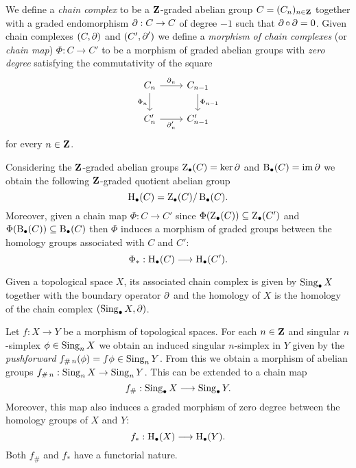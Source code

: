 \begin{definition}
\label{def:chain-complex}
We define a \emph{chain complex} to be a \(\mathbf{Z}\)-graded abelian group
\(C = (C_n)_{n \in \mathbf{Z}}\) together with a graded endomorphism \(\operatorname{\partial}: C \to C\)
of degree \(-1\) such that \(\operatorname{\partial} \circ \operatorname{\partial} = 0\). Given chain complexes
\((C, \operatorname{\partial})\) and \((C', \operatorname{\partial}')\) we define a \emph{morphism of chain
  complexes} (or \emph{chain map}) \(\Phi: C \to C'\) to be a morphism of graded
abelian groups with \emph{zero degree} satisfying the commutativity of the
square
\[
\begin{tikzcd}
C_n \ar[d, "\Phi_n"'] \ar[r, "\face_n"] &C_{n-1} \ar[d, "\Phi_{n-1}"] \\
C_n' \ar[r, "\face_n'"'] &C_{n-1}'
\end{tikzcd}
\]
for every \(n \in \mathbf{Z}\).

Considering the \(\mathbf{Z}\)-graded abelian groups \(\operatorname{Z}_{\bullet}(C) = \ker
\operatorname{\partial}\) and \(\operatorname{B}_{\bullet}(C) = \operatorname{im} \operatorname{\partial}\) we obtain the following
\(\mathbf{Z}\)-graded quotient abelian group
\[
\operatorname{H}_{\bullet}(C) = \operatorname{Z}_{\bullet}(C)/\operatorname{B}_{\bullet}(C).
\]
Moreover, given a chain map \(\Phi: C \to C'\) since
\(\Phi(\operatorname{Z}_{\bullet}(C)) \subseteq \operatorname{Z}_{\bullet}(C')\) and
\(\Phi(\operatorname{B}_{\bullet}(C)) \subseteq \operatorname{B}_{\bullet}(C)\) then \(\Phi\) induces
a morphism of graded groups between the homology groups associated with \(C\)
and \(C'\):
\[
\Phi_{*}: \operatorname{H}_{\bullet}(C) \longrightarrow \operatorname{H}_{\bullet}(C').
\]

Given a topological space \(X\), its associated chain complex is given by
\(\operatorname{Sing}_{\bullet} X\) together with the boundary operator \(\operatorname{\partial}\) and the
homology of \(X\) is the homology of the chain complex \((\operatorname{Sing}_{\bullet} X, \operatorname{\partial})\).
\end{definition}

\begin{proposition}
\label{prop:induced-chain-map-and-homology-map}
Let \(f: X \to Y\) be a morphism of topological spaces. For each \(n \in \mathbf{Z}\)
and singular \(n\)-simplex \(\phi \in \operatorname{Sing}_n X\) we obtain an induced singular
\(n\)-simplex in \(Y\) given by the \emph{pushforward}
\(f_{\#\, n}(\phi) = f \phi \in \operatorname{Sing}_n Y\). From this we obtain a morphism of
abelian groups \(f_{\#\, n}: \operatorname{Sing}_n X \to \operatorname{Sing}_n Y\). This can be extended to
a chain map
\[
f_{\#}: \operatorname{Sing}_{\bullet} X \longrightarrow \operatorname{Sing}_{\bullet} Y.
\]
Moreover, this map also induces a graded morphism of zero degree between the
homology groups of \(X\) and \(Y\):
\[
f_{*}: \operatorname{H}_{\bullet}(X) \longrightarrow \operatorname{H}_{\bullet}(Y).
\]
Both \(f_{\#}\) and \(f_{*}\) have a functorial nature.
\end{proposition}

